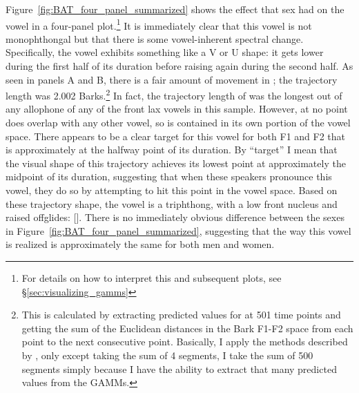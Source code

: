 Figure~\ref{fig:BAT_four_panel_summarized} shows the effect that sex had on the \bat vowel in a four-panel plot.\footnote{For details on how to interpret this and subsequent plots, see \S\ref{sec:visualizing_gamms}} It is immediately clear that this vowel is not monophthongal but that there is some vowel-inherent spectral change. Specifically, the vowel exhibits something like a V or U shape: it gets lower during the first half of its duration before raising again during the second half. As seen in panels A and B, there is a fair amount of movement in \bat; the trajectory length was 2.002 Barks.\footnote{This is calculated by extracting predicted values for \bat at 501 time points and getting the sum of the Euclidean distances in the Bark F1-F2 space from each point to the next consecutive point. Basically, I apply the methods described by \citet{fox_jacewicz_2009}, only except taking the sum of 4 segments, I take the sum of 500 segments simply because I have the ability to extract that many predicted values from the GAMMs.} In fact, the trajectory length of \bat was the longest out of any allophone of any of the front lax vowels in this sample. However, at no point does \bat overlap with any other vowel, so \bat is contained in its own portion of the vowel space. There appears to be a clear target for this vowel for both F1 and F2 that is approximately at the halfway point of its duration. By ``target'' I mean that the visual shape of this trajectory achieves its lowest point at approximately the midpoint of its duration, suggesting that when these speakers pronounce this vowel, they do so by attempting to hit this point in the vowel space. Based on these trajectory shape, the vowel is a triphthong, with a low front nucleus and raised offglides: []. There is no immediately obvious difference between the sexes in Figure~\ref{fig:BAT_four_panel_summarized}, suggesting that the way this vowel is realized is approximately the same for both men and women.

